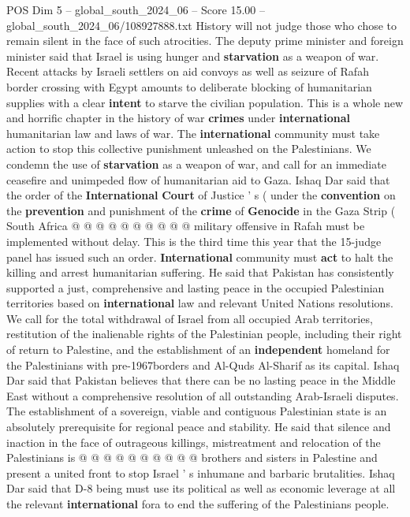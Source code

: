 \begin{textsample}{POS Dim 5 – global\_south\_2024\_06 – Score 15.00 – global\_south\_2024\_06/108927888.txt}
History will not judge those who chose to remain silent in the face of such atrocities.
The deputy prime minister and foreign minister said that Israel is using hunger and \textbf{starvation} as a weapon of war.
Recent attacks by Israeli settlers on aid convoys as well as seizure of Rafah border crossing with Egypt amounts to deliberate blocking of humanitarian supplies with a clear \textbf{intent} to starve the civilian population.
This is a whole new and horrific chapter in the history of war \textbf{crimes} under \textbf{international} humanitarian law and laws of war.
The \textbf{international} community must take action to stop this collective punishment unleashed on the Palestinians.
We condemn the use of \textbf{starvation} as a weapon of war, and call for an immediate ceasefire and unimpeded flow of humanitarian aid to Gaza.
Ishaq Dar said that the order of the \textbf{International} \textbf{Court} of Justice ' s ( under the \textbf{convention} on the \textbf{prevention} and punishment of the \textbf{crime} of \textbf{Genocide} in the Gaza Strip ( South Africa @ @ @ @ @ @ @ @ @ @ military offensive in Rafah must be implemented without delay.
This is the third time this year that the 15-judge panel has issued such an order. \textbf{International} community must \textbf{act} to halt the killing and arrest humanitarian suffering.
He said that Pakistan has consistently supported a just, comprehensive and lasting peace in the occupied Palestinian territories based on \textbf{international} law and relevant United Nations resolutions.
We call for the total withdrawal of Israel from all occupied Arab territories, restitution of the inalienable rights of the Palestinian people, including their right of return to Palestine, and the establishment of an \textbf{independent} homeland for the Palestinians with pre-1967borders and Al-Quds Al-Sharif as its capital.
Ishaq Dar said that Pakistan believes that there can be no lasting peace in the Middle East without a comprehensive resolution of all outstanding Arab-Israeli disputes.
The establishment of a sovereign, viable and contiguous Palestinian state is an absolutely prerequisite for regional peace and stability.
He said that silence and inaction in the face of outrageous killings, mistreatment and relocation of the Palestinians is @ @ @ @ @ @ @ @ @ @ brothers and sisters in Palestine and present a united front to stop Israel ' s inhumane and barbaric brutalities.
Ishaq Dar said that D-8 being must use its political as well as economic leverage at all the relevant \textbf{international} fora to end the suffering of the Palestinians people.

\end{textsample}
